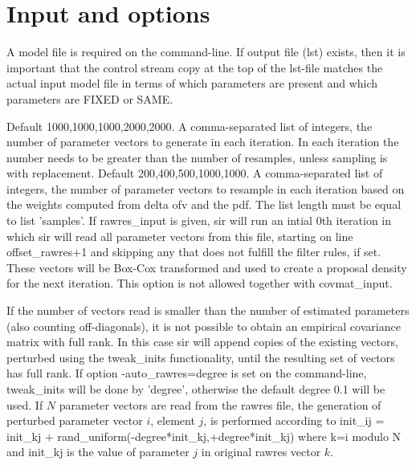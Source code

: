 \section{Input and options}
A model file is required on the command-line. 
If output file (lst) exists, then it is important that the control stream copy at the top of the lst-file matches the actual input model file
in terms of which parameters are present and which parameters are FIXED or SAME.
\begin{optionlist}
Default 1000,1000,1000,2000,2000.
A comma-separated list of integers, the number of parameter vectors to 
generate in each iteration. In each iteration the number needs to be greater than the number 
of resamples, unless sampling is with replacement.
\nextopt
{}
Default 200,400,500,1000,1000.
A comma-separated list of integers, the number of parameter vectors to resample 
in each iteration based on the weights
computed from delta ofv and the pdf. The list length must be equal to list 'samples'.
\nextopt
{}
If rawres\_input is given, sir will run an intial 0th iteration in which sir will read all parameter
vectors from this file, starting on line offset\_rawres+1 and skipping any that does not fulfill the filter rules, if set.
These vectors will be Box-Cox transformed and used to create a proposal density for the next iteration.
This option is not allowed together with covmat\_input. 

If the number of vectors read is smaller than 
the number of estimated parameters (also counting off-diagonals),
it is not possible to obtain an empirical covariance matrix with full rank.
In this case sir will append copies of the existing vectors, perturbed using the tweak\_inits
functionality, until the resulting set of vectors has full rank.
If option -auto\_rawres=degree is set on the command-line, tweak\_inits will be done by 'degree',
otherwise the default degree 0.1 will be used.
If $N$ parameter vectors are read from the rawres file,
the generation of perturbed parameter vector $i$, element $j$, is performed according to 
init\_ij = init\_kj + rand\_uniform(-degree*init\_kj,+degree*init\_kj) where k=i modulo N and init\_kj is the value of 
parameter $j$ in original rawres vector $k$. 


\end{optionlist}
